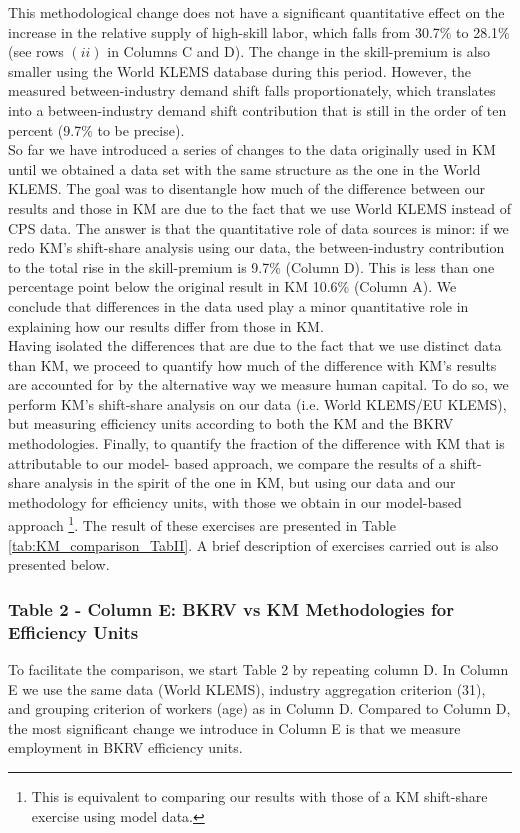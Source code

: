 \documentclass[10pt]{article}
\begin{document}
This methodological change does not have a significant quantitative effect on the increase in the relative supply of high-skill labor, which falls from 30.7\% to 28.1\% (see rows $(ii)$ in Columns C and D). The change in the skill-premium is also smaller using the World KLEMS database during this period. However, the measured between-industry demand shift falls proportionately, which translates into a between-industry demand shift contribution that is still in the order of ten percent (9.7\% to be precise).\\

So far we have introduced a series of changes to the data originally used in KM until we obtained a data set with the same structure as the one in the World KLEMS. The goal was to disentangle how much of the difference between our results and those in KM are due to the fact that we use World KLEMS instead of CPS data. The answer is that the quantitative role of data sources is minor: if we redo KM's shift-share analysis using our data, the between-industry contribution to the total rise in the skill-premium is 9.7\% (Column D). This is less than one percentage point below the original result in KM 10.6\% (Column A). We conclude that differences in the data used play a minor quantitative role in explaining how our results differ from those in KM.\\

Having isolated the differences that are due to the fact that we use distinct data than KM, we proceed to quantify how much of the difference with KM's results are accounted for by the alternative way we measure human capital. To do so, we perform KM's shift-share analysis on our data (i.e. World KLEMS/EU KLEMS), but measuring efficiency units according to both the KM and the BKRV methodologies. Finally, to quantify the fraction of the difference with KM that is attributable to our model- based approach, we compare the results of a shift-share analysis in the spirit of the one in KM, but using our data and our methodology for efficiency units, with those we obtain in our model-based approach \footnote{This is equivalent to comparing our results with those of a KM shift-share exercise using model data.}. The result of these exercises are presented in Table \ref{tab:KM_comparison_TabII}. A brief description of exercises carried out is also presented below.\\

\subsubsection*{Table 2 - Column E: BKRV vs KM Methodologies for Efficiency Units}
To facilitate the comparison, we start Table 2 by repeating column D. In Column E we use the same data (World KLEMS), industry aggregation criterion (31), and grouping criterion of workers (age) as in Column D. Compared to Column D, the most significant change we introduce in Column E is that we measure employment in BKRV efficiency units.\\
\end{document}
